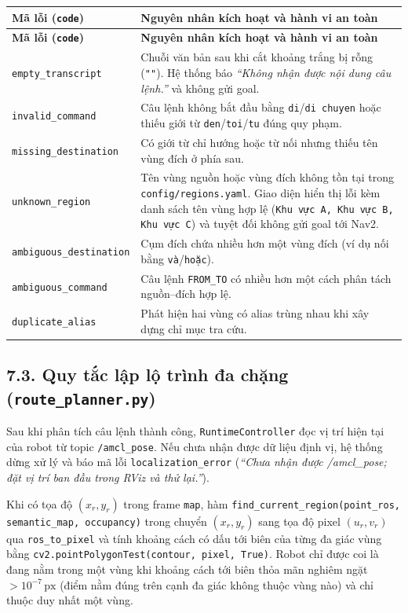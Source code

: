 \begin{longtable}{|p{}|p{}|}
\hline
\textbf{Mã lỗi (\texttt{code})} & \textbf{Nguyên nhân kích hoạt và hành vi an toàn} \\
\hline
\endfirsthead
\hline
\textbf{Mã lỗi (\texttt{code})} & \textbf{Nguyên nhân kích hoạt và hành vi an toàn} \\
\hline
\endhead
\texttt{empty\_transcript} & Chuỗi văn bản sau khi cắt khoảng trắng bị rỗng (\texttt{""}). Hệ thống báo \textit{``Không nhận được nội dung câu lệnh.''} và không gửi goal. \\
\hline
\texttt{invalid\_command} & Câu lệnh không bắt đầu bằng \texttt{di}/\texttt{di chuyen} hoặc thiếu giới từ \texttt{den}/\texttt{toi}/\texttt{tu} đúng quy phạm. \\
\hline
\texttt{missing\_destination} & Có giới từ chỉ hướng hoặc từ nối nhưng thiếu tên vùng đích ở phía sau. \\
\hline
\texttt{unknown\_region} & Tên vùng nguồn hoặc vùng đích không tồn tại trong \texttt{config/regions.yaml}. Giao diện hiển thị lỗi kèm danh sách tên vùng hợp lệ (\texttt{Khu vực A, Khu vực B, Khu vực C}) và tuyệt đối không gửi goal tới Nav2. \\
\hline
\texttt{ambiguous\_destination} & Cụm đích chứa nhiều hơn một vùng đích (ví dụ nối bằng \texttt{và}/\texttt{hoặc}). \\
\hline
\texttt{ambiguous\_command} & Câu lệnh \texttt{FROM\_TO} có nhiều hơn một cách phân tách nguồn--đích hợp lệ. \\
\hline
\texttt{duplicate\_alias} & Phát hiện hai vùng có alias trùng nhau khi xây dựng chỉ mục tra cứu. \\
\hline
\end{longtable}

\subsection*{7.3. Quy tắc lập lộ trình đa chặng (\texttt{route\_planner.py})}

Sau khi phân tích câu lệnh thành công, \texttt{RuntimeController} đọc vị trí hiện tại của robot từ topic \texttt{/amcl\_pose}. Nếu chưa nhận được dữ liệu định vị, hệ thống dừng xử lý và báo mã lỗi \texttt{localization\_error} (\textit{``Chưa nhận được /amcl\_pose; đặt vị trí ban đầu trong RViz và thử lại.''}).

Khi có tọa độ $(x_r, y_r)$ trong frame \texttt{map}, hàm \texttt{find\_current\_region(point\_ros, semantic\_map, occupancy)} trong  chuyển $(x_r, y_r)$ sang tọa độ pixel $(u_r, v_r)$ qua \texttt{ros\_to\_pixel} và tính khoảng cách có dấu tới biên của từng đa giác vùng bằng \texttt{cv2.pointPolygonTest(contour, pixel, True)}. Robot chỉ được coi là đang nằm trong một vùng khi khoảng cách tới biên thỏa mãn nghiêm ngặt $> 10^{-7}\,\text{px}$ (điểm nằm đúng trên cạnh đa giác không thuộc vùng nào) và chỉ thuộc duy nhất một vùng.

